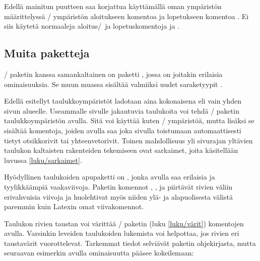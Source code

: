 \noindent
Edellä mainitun puutteen saa korjattua käyttämällä oman ympäristön
määrittelyssä \-/ ympäristön aloitukseen komentoa
 ja lopetukseen komentoa . Ei
siis käytetä normaaleja aloitus\-/\ ja lopetuskomentoja 
ja .

\begin{koodilohkosis}
\newenvironment{omataulukko}[1]
{\tabularx{\linewidth}{#1}}
{\endtabularx}
\end{koodilohkosis}

\subsection{Muita paketteja}

\-/ paketin kanssa samankaltainen on paketti
, jossa on joitakin erilaisia ominaisuuksia. Se
muun muassa sisältää valmiiksi uudet saraketyypit .

Edellä esitellyt taulukkoympäristöt ladotaan aina kokonaisena eli vain
yhden sivun alueelle. Useammalle sivulle jakautuvia taulukoita voi tehdä
\-/ paketin taulukkoympäristön
 avulla. Sitä voi käyttää kuten
\-/ ympäristöä, mutta lisäksi se sisältää komentoja,
joiden avulla saa joka sivulla toistumaan automaattisesti tietyt
otsikkorivit tai yhteenvetorivit. Toinen mahdollisuus yli sivurajan
yltävien taulukon kaltaisten rakenteiden tekemiseen ovat sarkaimet,
joita käsitellään luvussa \ref{luku/sarkaimet}.

Hyödyllinen taulukoiden apupaketti on , jonka
avulla saa erilaisia ja tyylikkäämpiä vaakaviivoja. Paketin komennot
, ,  ja
 piirtävät rivien väliin erivahvuisia viivoja ja
huolehtivat myös niiden ylä- ja alapuolisesta välistä paremmin kuin
Latexin omat viivakomennot.

Taulukon rivien taustan voi värittää \-/ paketin
(luku \ref{luku/värit}) komentojen avulla. Varsinkin leveiden
taulukoiden lukemista voi helpottaa, jos rivien eri taustavärit
vuorottelevat. Tarkemmat tiedot selviävät paketin ohjekirjasta, mutta
seuraavan esimerkin avulla ominaisuutta pääsee kokeilemaan:

\begin{koodilohkosis}
\usepackage[table]{xcolor}     %
\end{koodilohkosis}


